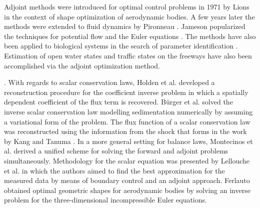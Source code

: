 Adjoint methods were introduced for optimal control problems in 1971 by Lions \cite{Lions1971OptimalEquations} in the context of shape optimization of aerodynamic bodies. A few years later the methods were extended to fluid dynamics by Pironneau \cite{Pironneau1974OnMechanics}. Jameson popularized the techniques for potential flow and the Euler equations \cite{Jameson1988AerodynamicTheory,Jameson1995OptimumTheory}. The methods have also been applied to biological systems in the search of parameter identification \cite{Raffard2008AnSignaling}. Estimation of open water states \cite{Castaings2006AutomaticModeling} and traffic states on the freeways \cite{Jacquet2005TrafficWaves} have also been accomplished via the adjoint optimization method.

 \cite{Gugat2005OptimalNetworks,Kotsialos2004NonlinearMetering,Giles2000AnDesign}  \cite{Gugat2005OptimalNetworks,Jacquet2005OPTIMALMETHODS,Moin1994FeedbackTurbulence,Reuther1996AerodynamicFormulation}  \cite{Reilly2015Adjoint-BasedMetering}  \cite{Muller2005OnDifferentiation,Giering1998RecipesConstruction}.
With regards to scalar conservation laws, Holden et al. \cite{Holden2014OnLaws} developed a reconstruction procedure for the coefficient inverse problem in which a spatially dependent coefficient of the flux term is recovered. B{\"{u}}rger et al. \cite{Burger2009NumericalSedimentation} solved the inverse scalar conservation law modelling sedimentation numerically by assuming a variational form of the problem.  The flux function of a scalar conservation law was reconstructed using the information from the shock that forms in the work by Kang and Tanuma \cite{Kang2005InverseLaws}.
In a more general setting for balance laws, Montecinos et al. \cite{Montecinos2005AProblems} derived a unified scheme for solving the forward and adjoint problems simultaneously. Methodology for the scalar  equation was presented by Lellouche et al. \cite{Lellouche1994BoundaryApproach} in which the authors aimed to find the best approximation for the measured data by means of boundary control and an adjoint approach. Ferlauto \cite{Ferlauto2015AEquations} obtained optimal geometric shapes for aerodynamic bodies by solving an inverse problem for the three-dimensional incompressible Euler equations.

